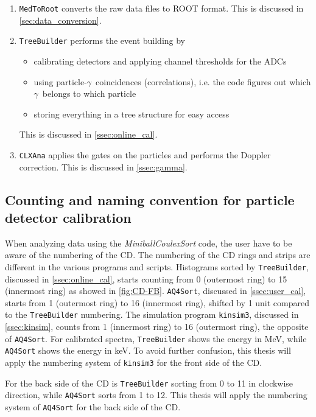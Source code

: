 \documentclass[twoside,english]{uiofysmaster/uiofysmaster}
\newcommand{\ga}{$\gamma$}
\let\orgautoref\autoref
\renewcommand{\autoref}
        {%
		 \def\sectionautorefname{Section}%
		 \def\subsectionautorefname{Section}%
		 \def\subsubsectionautorefname{Section}%
		 \def\chapterautorefname{Chapter}%
          \orgautoref}
\begin{document}
\begin{enumerate}
	\item \texttt{MedToRoot} converts the raw data files to ROOT format. This is discussed in  \autoref{sec:data_conversion}.
	\item \texttt{TreeBuilder} performs the event building by
		\begin{itemize}
			\item calibrating detectors and applying channel thresholds for the ADCs
			\item using particle-\ga\ coincidences (correlations), i.e. the code figures out which \ga\ belongs to which particle
			\item storing everything in a tree structure for easy access
		\end{itemize}
		This is discussed in \autoref{ssec:online_cal}.
	\item \texttt{CLXAna} applies the gates on the particles and performs the Doppler correction. This is discussed in \autoref{ssec:gamma}.
\end{enumerate}


\subsection{Counting and naming convention for particle detector calibration}
When analyzing data using the \textsl{MiniballCoulexSort} code, the user have to be aware of the numbering of the CD.
The numbering of the CD rings and strips are different in the various programs and scripts. 
Histograms sorted by \texttt{TreeBuilder}, discussed in \autoref{ssec:online_cal}, starts counting from 0 (outermost ring) to 15 (innermost ring) as showed in \autoref{fig:CD-FB}. 
\texttt{AQ4Sort}, discussed in \autoref{ssec:user_cal}, starts from 1 (outermost ring) to 16 (innermost ring), shifted by 1 unit compared to the \texttt{TreeBuilder} numbering.
The simulation program \texttt{kinsim3}, discussed in \autoref{ssec:kinsim}, counts from 1 (innermost ring) to 16 (outermost ring), the opposite of \texttt{AQ4Sort}. 
For calibrated spectra, \texttt{TreeBuilder} shows the energy in MeV, while \texttt{AQ4Sort} shows the energy in keV.
To avoid further confusion, this thesis will apply the numbering system of \texttt{kinsim3} for the front side of the CD.

For the back side of the CD is \texttt{TreeBuilder} sorting from 0 to 11 in clockwise direction, while \texttt{AQ4Sort} sorts from 1 to 12.
This thesis will apply the numbering system of \texttt{AQ4Sort} for the back side of the CD.
\end{document}
